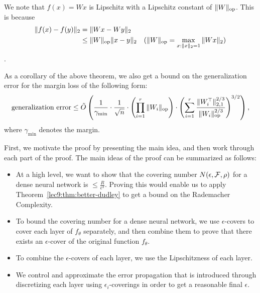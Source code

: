 \begin{remark}
    We note that $f(x) = Wx$ is Lipschitz with a Lipschitz constant of $\|W\|_{\textup{op}}$. This is because 
    \begin{align}
        \|f(x)-f(y)\|_2 &= \|Wx-Wy\|_2 \\
        &\leq \|W\|_{\textup{op}}\|x-y\|_2 &\text{$(\|W\|_{\textup{op}} = \max_{x:\|x\|_2=1}\|Wx\|_2)$}
    \end{align}. 
\end{remark}

\begin{remark}
    As a corollary of the above theorem, we also get a bound on the generalization error for the margin loss of the following form:
    \begin{equation}
        \textup{generalization error} \leq \tilde{O}\left(\frac{1}{\gamma_{\min}} \cdot \frac{1}{\sqrt{n}} \cdot \left(\prod_{i=1}^r\|W_i\|_{\textup{op}} \right) \cdot {\left( \sum_{i=1}^r\frac{\|W_i^\top\|^{2/3}_{2,1}}{\|W_i\|_{\textup{op}}^{2/3}}\right)^{3/2}}  \right),
    \end{equation}
    where $\gamma_{\min}$ denotes the margin.
\end{remark}
	
First, we motivate the proof by presenting the main idea, and then work through each part of the proof. The main ideas of the proof can be summarized as follows:
    
\begin{itemize}
    \item At a high level, we want to show that the covering number $N(\epsilon, \mathcal F, \rho)$ for a dense neural network is $\leq \frac{R}{\epsilon^2}$. Proving this would enable us to apply Theorem~\ref{lec9:thm:better-dudley} to get a bound on the Rademacher Complexity.
    \item To bound the covering number for a dense neural network, we use $\epsilon$-covers to cover each layer of $f_\theta$ separately, and then combine them to prove that there exists an $\epsilon$-cover of the original function $f_\theta$. 
    \item To combine the $\epsilon$-covers of each layer, we use the Lipschitzness of each layer.
    \item We control and approximate the error propagation that is introduced through discretizing each layer using $\epsilon_i$-coverings in order to get a reasonable final $\epsilon$.
\end{itemize}

